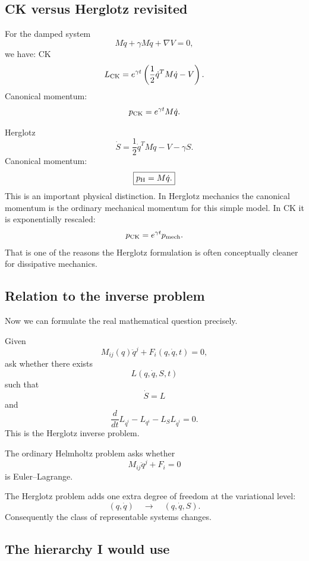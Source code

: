 \subsection{CK versus Herglotz revisited}

For the damped system
$$ M\ddot q+\gamma M\dot q+\nabla V=0, $$
we have:
CK
$$ L_{\rm CK} = e^{\gamma t} \left( \frac12\dot q^TM\dot q-V \right). $$
Canonical momentum:
$$ p_{\rm CK}=e^{\gamma t}M\dot q. $$

Herglotz
$$ \boxed{ \dot S= \frac12\dot q^TM\dot q -V-\gamma S. } $$
Canonical momentum:
$$ \boxed{ p_{\rm H}=M\dot q. } $$
This is an important physical distinction.
In Herglotz mechanics the canonical momentum is the ordinary mechanical momentum for this simple model.
In CK it is exponentially rescaled:
$$ p_{\rm CK}=e^{\gamma t}p_{\rm mech}. $$
That is one of the reasons the Herglotz formulation is often conceptually cleaner for dissipative mechanics.

\subsection{Relation to the inverse problem}

Now we can formulate the real mathematical question precisely.

Given
$$ \boxed{ M_{ij}(q)\ddot q^j+ F_i(q,\dot q,t)=0, } $$
ask whether there exists
$$ L(q,\dot q,S,t) $$
such that
$$ \dot S=L $$
and
$$ \frac{d}{dt}L_{\dot q^i} -L_{q^i} -L_SL_{\dot q^i}=0. $$
This is the Herglotz inverse problem.

The ordinary Helmholtz problem asks whether
$$ M_{ij}\ddot q^j+F_i=0 $$
is Euler–Lagrange.

The Herglotz problem adds one extra degree of freedom at the variational level:
$$ (q,\dot q) \quad\longrightarrow\quad (q,\dot q,S). $$
Consequently the class of representable systems changes.

\subsection{The hierarchy I would use}

